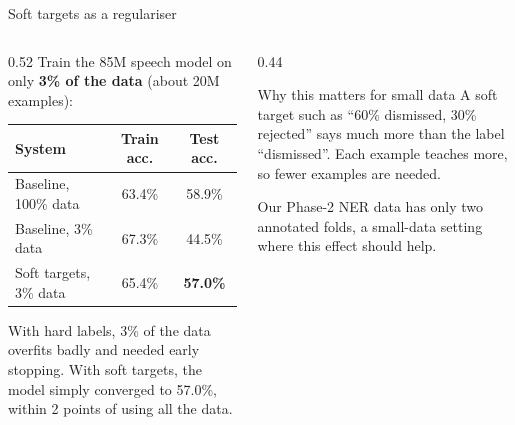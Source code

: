 \documentclass[aspectratio=169,11pt]{beamer}
\begin{document}
\begin{frame}{Soft targets as a regulariser}
  \begin{columns}[T]
    \begin{column}{0.52\textwidth}
      \small
      Train the 85M speech model on only \textbf{3\% of the data} (about 20M examples):
      \vspace{1mm}

      \begin{tabular}{@{}lcc@{}}
        \toprule
        System & Train acc. & Test acc.\\
        \midrule
        Baseline, 100\% data & 63.4\% & 58.9\%\\
        Baseline, 3\% data & 67.3\% & 44.5\%\\
        Soft targets, 3\% data & 65.4\% & \textbf{57.0\%}\\
        \bottomrule
      \end{tabular}
      \vspace{2mm}

      With hard labels, 3\% of the data overfits badly and needed early stopping. With soft targets, the model simply converged to 57.0\%, within 2 points of using all the data.
    \end{column}
    \begin{column}{0.44\textwidth}
      \begin{exampleblock}{Why this matters for small data}
        \small
        A soft target such as ``60\% dismissed, 30\% rejected'' says much more than the label ``dismissed''. Each example teaches more, so fewer examples are needed.
        \vspace{1mm}

        Our Phase-2 NER data has only two annotated folds, a small-data setting where this effect should help.
      \end{exampleblock}
    \end{column}
  \end{columns}
\end{frame}
\end{document}
